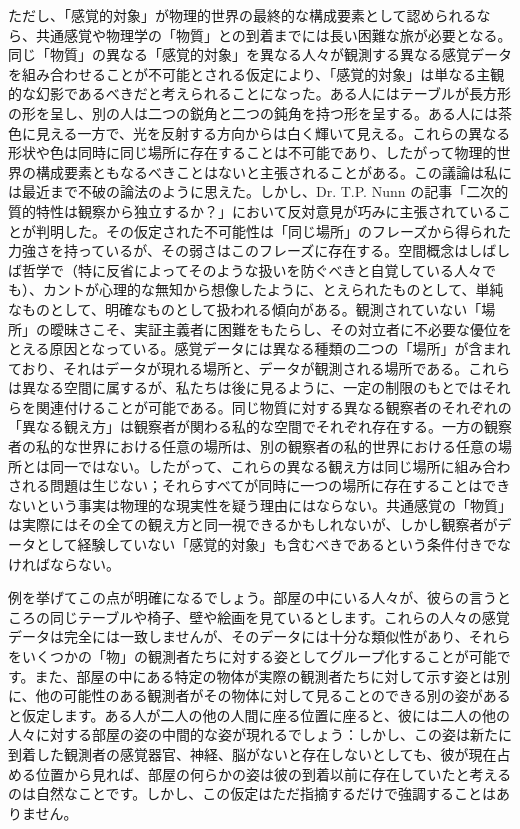 \documentclass[a4paper,11pt,openany]{ltjsbook}
\begin{document}
ただし、「感覚的対象」が物理的世界の最終的な構成要素として認められるなら、共通感覚や物理学の「物質」との到着までには長い困難な旅が必要となる。同じ「物質」の異なる「感覚的対象」を異なる人々が観測する異なる感覚データを組み合わせることが不可能とされる仮定により、「感覚的対象」は単なる主観的な幻影であるべきだと考えられることになった。ある人にはテーブルが長方形の形を呈し、別の人は二つの鋭角と二つの鈍角を持つ形を呈する。ある人には茶色に見える一方で、光を反射する方向からは白く輝いて見える。これらの異なる形状や色は同時に同じ場所に存在することは不可能であり、したがって物理的世界の構成要素ともなるべきことはないと主張されることがある。この議論は私には最近まで不破の論法のように思えた。しかし、Dr. T.P. Nunn の記事「二次的質的特性は観察から独立するか？」において反対意見が巧みに主張されていることが判明した。その仮定された不可能性は「同じ場所」のフレーズから得られた力強さを持っているが、その弱さはこのフレーズに存在する。空間概念はしばしば哲学で（特に反省によってそのような扱いを防ぐべきと自覚している人々でも）、カントが心理的な無知から想像したように、とえられたものとして、単純なものとして、明確なものとして扱われる傾向がある。観測されていない「場所」の曖昧さこそ、実証主義者に困難をもたらし、その対立者に不必要な優位をとえる原因となっている。感覚データには異なる種類の二つの「場所」が含まれており、それはデータが現れる場所と、データが観測される場所である。これらは異なる空間に属するが、私たちは後に見るように、一定の制限のもとではそれらを関連付けることが可能である。同じ物質に対する異なる観察者のそれぞれの「異なる観え方」は観察者が関わる私的な空間でそれぞれ存在する。一方の観察者の私的な世界における任意の場所は、別の観察者の私的世界における任意の場所とは同一ではない。したがって、これらの異なる観え方は同じ場所に組み合わされる問題は生じない；それらすべてが同時に一つの場所に存在することはできないという事実は物理的な現実性を疑う理由にはならない。共通感覚の「物質」は実際にはその全ての観え方と同一視できるかもしれないが、しかし観察者がデータとして経験していない「感覚的対象」も含むべきであるという条件付きでなければならない。


例を挙げてこの点が明確になるでしょう。部屋の中にいる人々が、彼らの言うところの同じテーブルや椅子、壁や絵画を見ているとします。これらの人々の感覚データは完全には一致しませんが、そのデータには十分な類似性があり、それらをいくつかの「物」の観測者たちに対する姿としてグループ化することが可能です。また、部屋の中にある特定の物体が実際の観測者たちに対して示す姿とは別に、他の可能性のある観測者がその物体に対して見ることのできる別の姿があると仮定します。ある人が二人の他の人間に座る位置に座ると、彼には二人の他の人々に対する部屋の姿の中間的な姿が現れるでしょう：しかし、この姿は新たに到着した観測者の感覚器官、神経、脳がないと存在しないとしても、彼が現在占める位置から見れば、部屋の何らかの姿は彼の到着以前に存在していたと考えるのは自然なことです。しかし、この仮定はただ指摘するだけで強調することはありません。
\end{document}

